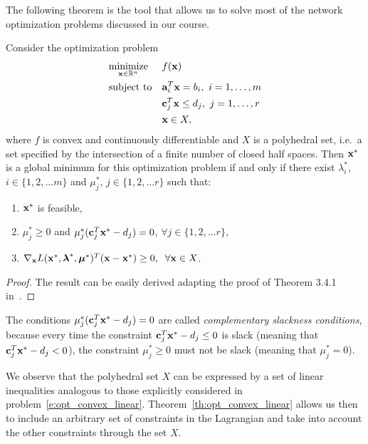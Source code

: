 The following theorem is the tool that allows us to solve most of the network optimization problems discussed in our course.
\begin{theorem}
Consider the optimization problem
\begin{equation}
\begin{aligned}
& \underset{\mathbf{x} \in \mathbb{R}^n}{\textnormal{minimize}}
	& & f(\mathbf{x}) \\
& \textnormal{subject to}
      & &  \mathbf{a}_i^T \mathbf{x}=b_i, \text{  }i=1,\dots,m\\
&       & & \mathbf{c}_j^T \mathbf{x} \le d_j, \text{  }j=1,\dots,r\\
&	& & \mathbf{x} \in X,
\end{aligned}
\label{e:opt_convex_linear}
\end{equation}
where $f$ is convex and continuously differentiable and $X$ is a polyhedral set, i.e.~a set specified by the intersection of a finite number of closed half spaces. 
Then $\mathbf{x}^*$ is a global minimum for this optimization problem if and only if there exist $\lambda_i^*$, $i \in \{1,2,\dots m\}$ and $\mu_j^*$, $j \in \{1,2, \dots r\}$ such that:
\begin{enumerate}
\item $\mathbf{x}^*$ is feasible,
\item $\mu_j^*\ge 0$ and $\mu_j^* (\mathbf{c}_j^T \mathbf{x}^* - d_j) =0$, $\forall j \in \{1, 2, \dots r\}$,
\item $\nabla_{\mathbf{x}} L(\mathbf{x}^*,\boldsymbol{\lambda}^*,\boldsymbol{\mu}^*)^T (\mathbf{x} - \mathbf{x}^*) \ge 0, \;\; \forall \mathbf{x} \in X$.
\end{enumerate}
\label{th:opt_convex_linear}
\end{theorem}
\begin{proof}
The result can be easily derived adapting the proof of Theorem 3.4.1 in~\cite{Ber99}.
\end{proof}

\begin{remark}
The conditions $\mu_j^* (\mathbf{c}_j^T \mathbf{x}^* - d_j) =0$ are called \emph{complementary slackness conditions}, because every time the constraint $\mathbf{c}_j^T \mathbf{x}^* - d_j\le 0$ is slack (meaning that $\mathbf{c}_j^T \mathbf{x}^* - d_j <0$), the constraint $\mu_j^*\ge0$ must not be slack (meaning that $\mu_j^*=0$).
\end{remark}

\begin{remark}
We observe that the polyhedral set $X$ can be expressed by a set of linear inequalities analogous to those explicitly considered in problem~\eqref{e:opt_convex_linear}. Theorem~\ref{th:opt_convex_linear} allows us then to include an arbitrary set of constraints in the Lagrangian and take into account the other constraints through the set $X$.
\end{remark}


